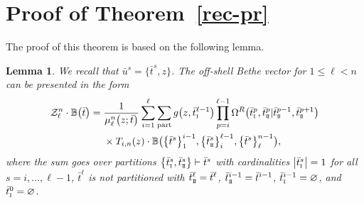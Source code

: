 \documentclass[10pt,a4paper]{amsart}
\newcommand{\so}{\scriptscriptstyle \rm I}
\newcommand{\st}{\scriptscriptstyle \rm I\hspace{-1pt}I}
\newcommand{\bu}{\bar u}
\newcommand{\bt}{{\bar t}}
\newtheorem{lem}[thm]{Lemma}
\theoremstyle{definition}
\def\BB{{\mathbb{B}}}
\def\Z{\mathcal{Z}}
\def\Omr{\Omega^R}
\begin{document}
\appendix


\section[Proof of the Theorem 3.1]{Proof of Theorem~\ref{rec-pr}}\label{ApA}

The proof of this theorem is based on the following lemma.
\begin{lem}\label{l-pr}
We recall that $\bar u^s=\bigl\{\bar t^s,z\bigr\}$.
The off-shell Bethe vector
\smash{$\BB\bigl(\bigl\{\bt^s\bigr\}_1^{\ell-1},\bigl\{\bu^s\bigr\}_\ell^{n-1}\bigr)$} for $1\leq \ell< n$
can be presented in the form
\begin{align}
\Z_{\ell}^n\cdot \BB\bigl(\bt\bigr)={}&
\frac{1}{\mu_\ell^n\bigl(z;\bt\bigr)}
\sum_{i=1}^\ell \sum_{\rm part} g\bigl(z,\bt^{\ell-1}_{\so}\bigr)
\prod_{p=i}^{\ell-1}\Omr\bigl(\bt^p_{\so},\bt^p_{\st}|\bt^{p-1}_{\st},\bt^{p+1}_{\st}\bigr)\nonumber
\\
&\times T_{i,n}(z)\cdot\BB\bigl(\bigl\{\bt^s\bigr\}_1^{i-1},\bigl\{\bt^s_{\st}\bigr\}_i^{\ell-1},
\bigl\{\bt^s\bigr\}_\ell^{n-1}\bigr) ,\label{Az8}
\end{align}
where the sum goes over partitions $\bigl\{\bt^s_{\so},\bt^s_{\st}\bigr\}\vdash\bt^s$
with cardinalities $\big|\bt^s_{\so}\big|=1$ for all $s=i,\dots,\ell-1$, $\bt^\ell$ is not
 partitioned with $\bt^\ell_{\st}=\bt^\ell$, $\bt^{i-1}_{\st} = \bt^{i-1}$, $\bt^{i-1}_{\so} = \varnothing$, and $\bt^0_{\so} = \varnothing$.
\end{lem}
\end{document}
